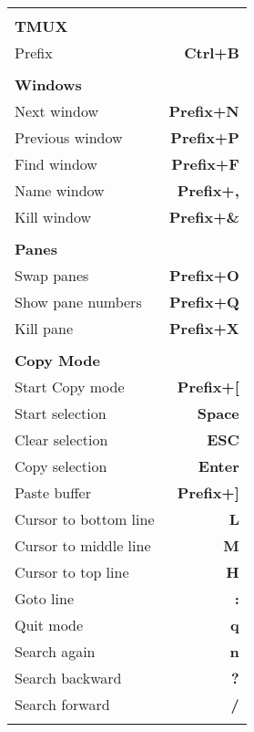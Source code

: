 \documentclass[10pt,a4paper,landscape,draft,sans]{scrartcl}
\newcommand\Ctl{Ctrl}
\newcommand\Ent{Enter}
\newcommand\Prf{Prefix}
\newcommand\Esc{ESC}
\newcommand{\theader}[1]{
    \rule{0pt}{6ex} \\
    \textbf{\uppercase{#1}} & \\
    \noalign{\global\arrayrulewidth=1.5pt}
    \hline
}
\newcommand{\tsubheader}[1]{
    \rule{0pt}{1ex} \\
    \textbf{#1} & \\
    \noalign{\global\arrayrulewidth=0.5pt}
    \hline
}
\newcommand{\tshortcut}[2]{
    #1 & \textbf{#2} \\
    \noalign{\global\arrayrulewidth=0.5pt}
    \hline
}
\begin{document}
\begin{multicols}{3}
\begin{supertabular}{@{}p{5cm}r@{}}
    \theader{Tmux}
    \tshortcut{\Prf}{\Ctl+B}
    \tsubheader{Windows}
    \tshortcut{Next window}{\Prf+N}
    \tshortcut{Previous window}{\Prf+P}
    \tshortcut{Find window}{\Prf+F}
    \tshortcut{Name window}{\Prf+,}
    \tshortcut{Kill window}{\Prf+\&}
    \tsubheader{Panes}
    \tshortcut{Swap panes}{\Prf+O}
    \tshortcut{Show pane numbers}{\Prf+Q}
    \tshortcut{Kill pane}{\Prf+X}
    \tsubheader{Copy Mode}
    \tshortcut{Start Copy mode}{\Prf+[}
    \tshortcut{Start selection}{Space}
    \tshortcut{Clear selection}{\Esc}
    \tshortcut{Copy selection}{\Ent}
    \tshortcut{Paste buffer}{\Prf+]}
    \tshortcut{Cursor to bottom line}{L}
    \tshortcut{Cursor to middle line}{M}
    \tshortcut{Cursor to top line}{H}
    \tshortcut{Goto line}{:}
    \tshortcut{Quit mode}{q}
    \tshortcut{Search again}{n}
    \tshortcut{Search backward}{?}
    \tshortcut{Search forward}{/}
\end{supertabular}

\end{multicols}
\end{document}
